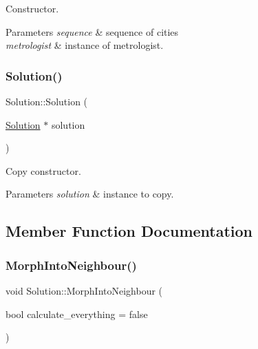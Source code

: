 Constructor. 


\begin{DoxyParams}{Parameters}
{\em sequence} & sequence of cities \\
\hline
{\em metrologist} & instance of metrologist. \\
\hline
\end{DoxyParams}
\mbox{\label{classSolution_adb1a72acc2b2dd9556574a249f10e6cc}} 
\subsubsection{\texorpdfstring{Solution()}{Solution()}\hspace{0.1cm}{\footnotesize\ttfamily [2/2]}}
{\footnotesize\ttfamily Solution\+::\+Solution (\begin{DoxyParamCaption}\item[{\hyperlink{classSolution}{Solution} $\ast$}]{solution }\end{DoxyParamCaption})}



Copy constructor. 


\begin{DoxyParams}{Parameters}
{\em solution} & instance to copy. \\
\hline
\end{DoxyParams}


\subsection{Member Function Documentation}
\mbox{\label{classSolution_a5ee367863638e53c2e17222ac3f347d7}} 
\subsubsection{\texorpdfstring{Morph\+Into\+Neighbour()}{MorphIntoNeighbour()}}
{\footnotesize\ttfamily void Solution\+::\+Morph\+Into\+Neighbour (\begin{DoxyParamCaption}\item[{bool}]{calculate\+\_\+everything = {\ttfamily false} }\end{DoxyParamCaption})}




